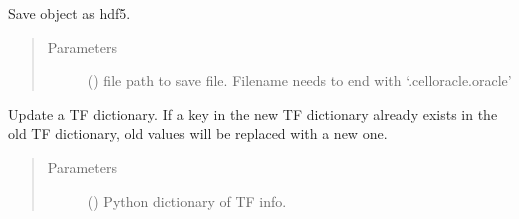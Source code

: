 \documentclass[letterpaper,10pt,english]{sphinxmanual}
\begin{document}
\begin{fulllineitems}

\begin{fulllineitems}
\label{\detokenize{modules/celloracle:celloracle.Oracle.to_hdf5}}
Save object as hdf5.
\begin{quote}\begin{description}
\item[{Parameters}] \leavevmode
{} () \textendash{} file path to save file. Filename needs to end with ‘.celloracle.oracle’

\end{description}\end{quote}

\end{fulllineitems}


\begin{fulllineitems}
\label{\detokenize{modules/celloracle:celloracle.Oracle.updateTFinfo_dictionary}}
Update a TF dictionary.
If a key in the new TF dictionary already exists in the old TF dictionary, old values will be replaced with a new one.
\begin{quote}\begin{description}
\item[{Parameters}] \leavevmode
{} () \textendash{} Python dictionary of TF info.

\end{description}\end{quote}

\end{fulllineitems}


\end{fulllineitems}

\end{document}
